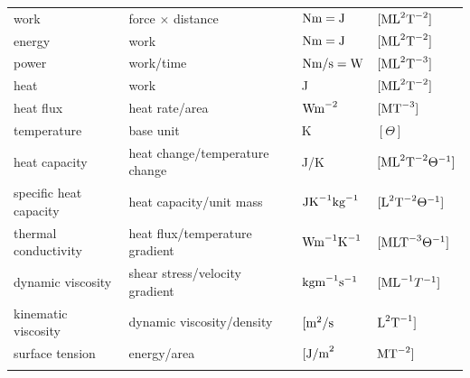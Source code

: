 \documentclass[graybox,envcountchap,sectrefs,final]{svmonodo}
\begin{document}
{\begin{tabular}{llll}
work                                 & force $\times$ distance                  & $\hbox{Nm} = \hbox{J}$         & $[\hbox{ML}^2\hbox{T}^{-2}]$            \\
energy                               & work                                     & $\hbox{Nm} = \hbox{J}$         & $[\hbox{ML}^2\hbox{T}^{-2}]$            \\
power                                & work/time                                & $\hbox{Nm/s} = \hbox{W}$       & $[\hbox{ML}^2\hbox{T}^{-3}]$            \\
heat                                 & work                                     & J                              & $[\hbox{ML}^2\hbox{T}^{-2}]$            \\
heat flux                            & heat rate/area                           & $\hbox{Wm}^{-2}$               & $[\hbox{MT}^{-3}]$                      \\
temperature                          & base unit                                & K                              & $[\Theta]$                              \\
heat capacity                        & heat change/temperature change           & J/K                            & $[\hbox{ML}^2\hbox{T}^{-2}\Theta^{-1}]$ \\
specific heat capacity               & heat capacity/unit mass                  & $\hbox{JK}^{-1}\hbox{kg}^{-1}$ & $[\hbox{L}^2\hbox{T}^{-2}\Theta^{-1}]$  \\
thermal conductivity                 & heat flux/temperature gradient           & $\hbox{Wm}^{-1}\hbox{K}^{-1}$  & $[\hbox{MLT}^{-3}\Theta^{-1}]$          \\
dynamic viscosity                    & shear stress/velocity gradient           & $\hbox{kgm}^{-1}\hbox{s}^{-1}$ & $[\hbox{ML}^{-1}T^{-1}]$                \\
kinematic viscosity                  & dynamic viscosity/density                & $[\hbox{m}^2/\hbox{s}$         & $\hbox{L}^2\hbox{T}^{-1}]$              \\
surface tension                      & energy/area                              & $[\hbox{J/m}^2$                & $\hbox{MT}^{-2}]$                       \\
\noalign{\smallskip}\hline\noalign{\smallskip}
\end{tabular}

\vspace{4mm}

}
\end{document}
